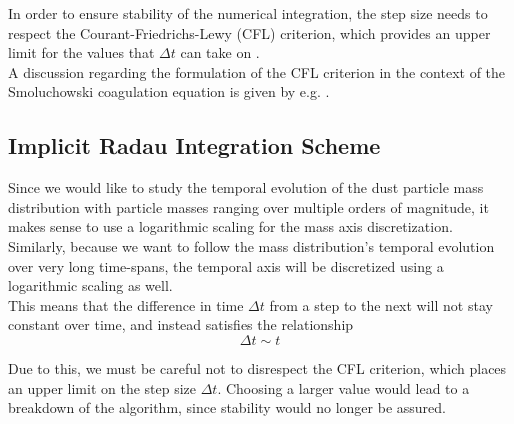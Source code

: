         In order to ensure stability of the numerical integration, the step size needs to respect 
        the Courant-Friedrichs-Lewy (CFL) criterion, which provides an upper limit for the values 
        that $\Delta t$ can take on \cite{courant_friedrichs_lewy_1928}. \\

        A discussion regarding the formulation of the CFL criterion in the context of the 
        Smoluchowski coagulation equation is given by e.g. \cite{laibe_lombart_2021}.
        

    \clearpage\subsection{Implicit Radau Integration Scheme}

        Since we would like to study the temporal evolution of the dust particle mass 
        distribution with particle masses ranging over multiple orders of magnitude, it makes 
        sense to use a logarithmic scaling for the mass axis discretization. \\

        Similarly, because we want to follow the mass distribution's temporal evolution
        over very long time-spans, the temporal axis will be discretized using a 
        logarithmic scaling as well. \\

        This means that the difference in time $\Delta t$ from a step to the next will not 
        stay constant over time, and instead satisfies the relationship 
        \begin{equation}
            \Delta t \sim t
        \end{equation}

        Due to this, we must be careful not to disrespect the CFL criterion, which places 
        an upper limit on the step size $\Delta t$. Choosing a larger value would lead to 
        a breakdown of the algorithm, since stability would no longer be assured. \\


